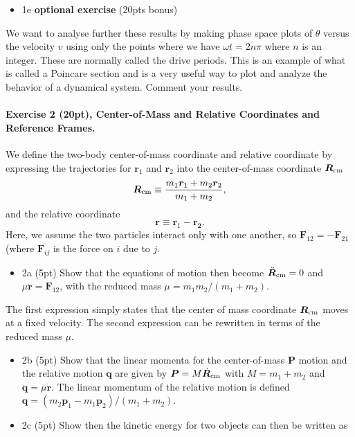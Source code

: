 \documentclass[%
oneside,                 %
final,                   %
10pt]{article}
\begin{document}
\begin{itemize}
\item 1e \textbf{optional exercise} (20pts bonus)
\end{itemize}

\noindent
We want to analyse further these results by making phase space plots
of $\theta$ versus the velocity $v$ using only the points where we
have $\omega t=2n\pi$ where $n$ is an integer. These are normally
called the drive periods.  This is an example of what is called a
Poincare section and is a very useful way to plot and analyze the
behavior of a dynamical system. Comment your results.

\paragraph{Exercise 2 (20pt), Center-of-Mass and Relative Coordinates and Reference Frames.}
We define the two-body center-of-mass coordinate and relative coordinate by expressing the trajectories for
$\bm{r}_1$ and $\bm{r}_2$ into the center-of-mass coordinate
$\bm{R}_{\rm cm}$ 
\[
\bm{R}_{\rm cm}\equiv\frac{m_1\bm{r}_1+m_2\bm{r}_2}{m_1+m_2},
\]
and the relative coordinate 
\[
\bm{r}\equiv\bm{r}_1-\bm{r_2}.
\]
Here, we assume the two particles interact only with one another, so $\bm{F}_{12}=-\bm{F}_{21}$ (where $\bm{F}_{ij}$ is the force on $i$ due to $j$.

\begin{itemize}
\item 2a (5pt) Show that the equations of motion then become $\ddot{\bm{R}}_{\rm cm}=0$ and $\mu\ddot{\bm{r}}=\bm{F}_{12}$, with the reduced mass $\mu=m_1m_2/(m_1+m_2)$.
\end{itemize}

\noindent
The first expression simply states that the center of mass coordinate $\bm{R}_{\rm cm}$ moves at a fixed velocity. The second expression can be rewritten in terms of the reduced mass $\mu$.

\begin{itemize}
\item 2b (5pt) Show that the linear momenta for the center-of-mass $\bm{P}$ motion and the relative motion $\bm{q}$ are given by $\bm{P}=M\dot{\bm{R}}_{\rm cm}$ with $M=m_1+m_2$ and $\bm{q}=\mu\dot{\bm{r}}$.  The linear momentum of the relative motion is defined $\bm{q} = (m_2\bm{p}_1-m_1\bm{p}_2)/(m_1+m_2)$.

\item 2c (5pt) Show then the kinetic energy for two objects can then be written as
\end{itemize}
\end{document}
